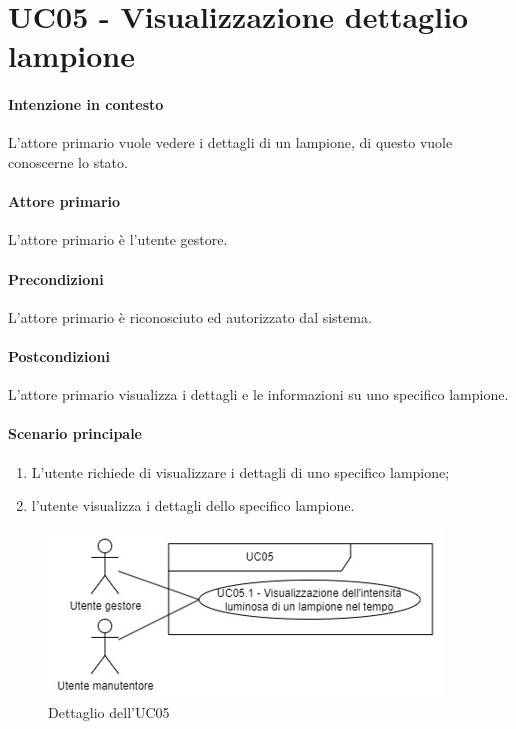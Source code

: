 \section{UC05 - Visualizzazione dettaglio lampione}\label{uc:05}
\paragraph{Intenzione in contesto} L'attore primario vuole vedere i dettagli di un lampione, di questo vuole conoscerne lo stato.
\paragraph{Attore primario} L'attore primario è l'utente gestore.
\paragraph{Precondizioni}L'attore primario è riconosciuto ed autorizzato dal sistema.
\paragraph{Postcondizioni} L'attore primario visualizza i dettagli e le informazioni su uno specifico lampione.
\paragraph{Scenario principale}
\begin{enumerate}
    \item L'utente richiede di visualizzare i dettagli di uno specifico lampione;
    \item l'utente visualizza i dettagli dello specifico lampione.
\end{enumerate}

\begin{figure}[h]
    \includegraphics[width=\textwidth]{contenuti/img/casi_uso_grafici-uc5.png}
    \caption{Dettaglio dell'UC05}
    \label{fig:uc05}
\end{figure}

